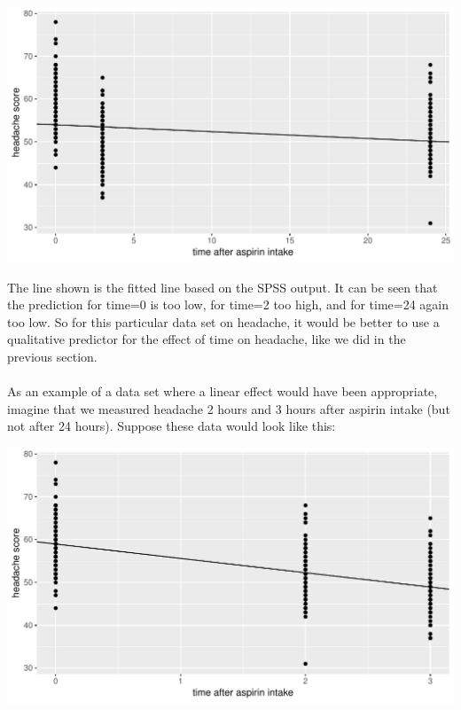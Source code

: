 \documentclass[]{report}\usepackage[]{graphicx}\usepackage[]{color}
\makeatletter
\def\maxwidth{ %
  \ifdim\Gin@nat@width>\linewidth
    \linewidth
  \else
    \Gin@nat@width
  \fi
}
\newenvironment{knitrout}{}{} %
\makeatother
\begin{document}
\begin{knitrout}
\color{fgcolor}

{\centering \includegraphics[width=\maxwidth]{figure/analysispremidpost5-1} 

}



\end{knitrout}

The line shown is the fitted line based on the SPSS output. It can be seen that the prediction for time=0 is too low, for time=2 too high, and for time=24 again too low. So for this particular data set on headache, it would be better to use a qualitative predictor for the effect of time on headache, like we did in the previous section.
\\
\\
As an example of a data set where a linear effect would have been appropriate, imagine that we measured headache 2 hours and 3 hours after aspirin intake (but not after 24 hours). Suppose these data would look like this:


\begin{knitrout}
\color{fgcolor}

{\centering \includegraphics[width=\maxwidth]{figure/analysispremidpost6-1} 

}



\end{knitrout}
\end{document}
